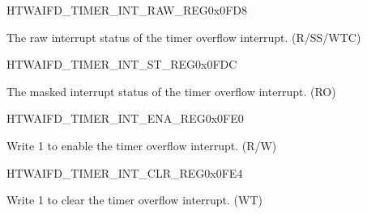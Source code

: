 \begin{register}{H}{TWAIFD\_TIMER\_INT\_RAW\_REG}{0x0FD8}\label{regdesc:TWAIFDTIMERINTRAWREG}
%
%
\regnewline%
\begin{regdesc}\begin{reglist}
\label{fielddesc:TWAIFDTIMEROVERFLOWINTRAW}\item [TWAIFD\_TIMER\_OVERFLOW\_INT\_RAW] The raw interrupt status of the timer overflow interrupt. (R/SS/WTC)
\end{reglist}\end{regdesc}
\end{register}


\begin{register}{H}{TWAIFD\_TIMER\_INT\_ST\_REG}{0x0FDC}\label{regdesc:TWAIFDTIMERINTSTREG}
%
%
\regnewline%
\begin{regdesc}\begin{reglist}
\label{fielddesc:TWAIFDTIMEROVERFLOWINTST}\item [TWAIFD\_TIMER\_OVERFLOW\_INT\_ST] The masked interrupt status of the timer overflow interrupt. (RO)
\end{reglist}\end{regdesc}
\end{register}


\begin{register}{H}{TWAIFD\_TIMER\_INT\_ENA\_REG}{0x0FE0}\label{regdesc:TWAIFDTIMERINTENAREG}
%
%
\regnewline%
\begin{regdesc}\begin{reglist}
\label{fielddesc:TWAIFDTIMEROVERFLOWINTENA}\item [TWAIFD\_TIMER\_OVERFLOW\_INT\_ENA] Write 1 to enable the timer overflow interrupt. (R/W)
\end{reglist}\end{regdesc}
\end{register}


\begin{register}{H}{TWAIFD\_TIMER\_INT\_CLR\_REG}{0x0FE4}\label{regdesc:TWAIFDTIMERINTCLRREG}
%
%
\regnewline%
\begin{regdesc}\begin{reglist}
\label{fielddesc:TWAIFDTIMEROVERFLOWINTCLR}\item [TWAIFD\_TIMER\_OVERFLOW\_INT\_CLR] Write 1 to clear the timer overflow interrupt. (WT)
\end{reglist}\end{regdesc}
\end{register}


